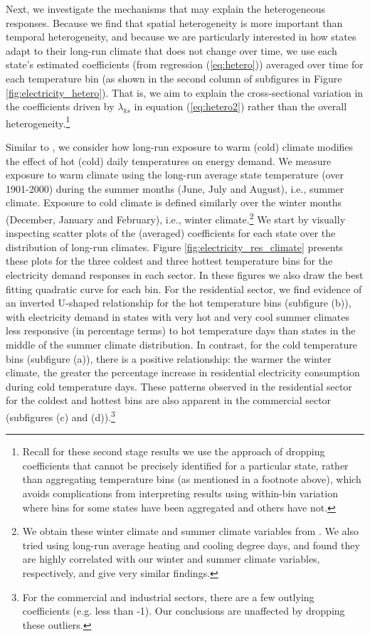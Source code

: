 \documentclass[11pt]{article}
\begin{document}
Next, we investigate the mechanisms that may explain the heterogeneous responses. Because we find that spatial heterogeneity is more important than temporal heterogeneity, and because we are particularly interested in how states adapt to their long-run climate that does not change over time, we use each state's estimated coefficients (from regression (\ref{eq:hetero})) averaged over time for each temperature bin (as shown in the second column of subfigures in Figure \ref{fig:electricity_hetero}). That is, we aim to explain the cross-sectional variation in the coefficients driven by $\lambda_{ks}$ in equation (\ref{eq:hetero2}) rather than the overall heterogeneity.\footnote{ Recall for these second stage results we use the approach of dropping coefficients that cannot be precisely identified for a particular state, rather than aggregating temperature bins (as mentioned in a footnote above), which avoids complications from interpreting results using within-bin variation where bins for some states have been aggregated and others have not.} 

Similar to \cite{Rode2021}, we consider how long-run exposure to warm (cold) climate modifies the effect of hot (cold) daily temperatures on energy demand. We measure exposure to warm climate using the long-run average state temperature (over 1901-2000) during the summer months (June, July and August), i.e., summer climate. Exposure to cold climate is defined similarly over the winter months (December, January and February), i.e., winter climate.\footnote{ We obtain these winter climate and summer climate variables from \cite{NOAAa}. We also tried using long-run average heating and cooling degree days, and found they are highly correlated with our winter and summer climate variables, respectively, and give very similar findings.} We start by visually inspecting scatter plots of the (averaged) coefficients for each state over the distribution of long-run climates. Figure \ref{fig:electricity_res_climate} presents these plots for the three coldest and three hottest temperature bins for the electricity demand responses in each sector. In these figures we also draw the best fitting quadratic curve for each bin. For the residential sector, we find evidence of an inverted U-shaped relationship for the hot temperature bins (subfigure (b)), with electricity demand in states with very hot and very cool summer climates less responsive (in percentage terms) to hot temperature days than states in the middle of the summer climate distribution. In contrast, for the cold temperature bins (subfigure (a)), there is a positive relationship: the warmer the winter climate, the greater the percentage increase in residential electricity consumption during cold temperature days. These patterns observed in the residential sector for the coldest and hottest bins are also apparent in the commercial sector (subfigures (c) and (d)).\footnote{ For the commercial and industrial sectors, there are a few outlying coefficients (e.g. less than -1). Our conclusions are unaffected by dropping these outliers.}
\end{document}
